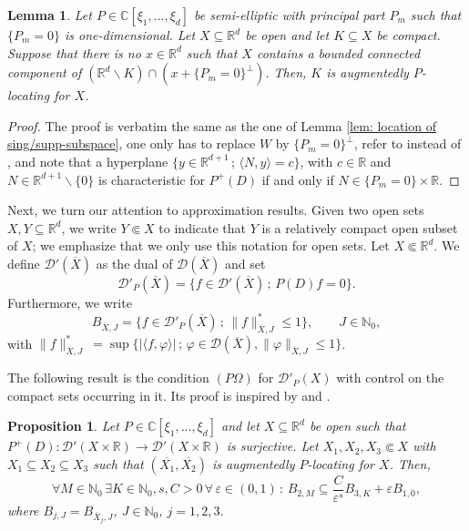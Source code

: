 \documentclass[12pt]{amsart}
\newcommand{\N}{\mathbb{N}}
\newcommand{\R}{\mathbb{R}}
\newcommand{\C}{\mathbb{C}}
\newtheorem{proposition}[theorem]{Proposition}
\newtheorem{lemma}[theorem]{Lemma}
\theoremstyle{definition}
\theoremstyle{remark}
\numberwithin{equation}{section}
\begin{document}
\begin{lemma}\label{prop: location of sing/supp-onedim}
	Let $P\in\C[\xi_1,\ldots,\xi_d]$ be semi-elliptic with principal part $P_m$ such that $\{P_m=0\}$ is one-dimensional. Let $X \subseteq \R^d$ be open and let $K \subseteq X$ be compact. Suppose that there is no $x\in\R^d$ such that $X$ contains a  bounded connected component of $\left(\R^d\backslash K\right)\cap\left(x+\{P_m=0\}^\perp\right)$.  Then, $K$ is augmentedly $P$-locating for $X$.
\end{lemma}	

\begin{proof}
The proof  is verbatim the same as the one of Lemma \ref{lem: location of sing/supp-subspace}, one only has to replace $W$ by $\{P_m=0\}^\perp$, refer to  \cite[Theorem 1]{FrKa} instead of \cite[Lemma 8]{Kalmes19}, and note that a hyperplane  $\{y\in\R^{d+1}\, ; \,\langle N, y \rangle =c \}$, with $c \in \R$ and $N \in \R^{d+1}\backslash \{0\}$ is characteristic for $P^+(D)$ if and only if $N\in\{P_m=0\}\times\R$.	
\end{proof} 

Next, we turn our attention to approximation results. Given two open sets $X,Y \subseteq \R^d$, we write $Y \Subset X$ to indicate that $Y$ is a relatively compact open subset of $X$; we emphasize that we only use this notation for open sets. Let $X \Subset \R^d$. We define $\mathscr{D}'(\overline{X})$ as the dual of $\mathscr{D}(\overline{X})$ and set
$$
\mathscr{D}'_P(\overline{X}) = \{f \in \mathscr{D}'(\overline{X}) \, ; \, P(D) f = 0\}.
$$
Furthermore, we write
$$
B_{\overline{X},J}=\{f \in\mathscr{D}'_P(\overline{X})\, ; \, \| f \|^*_{\overline{X},J}\leq 1\}, \qquad J \in \N_0,
$$
with $\| f \|^*_{\overline{X},J}\ = \sup \{ |\langle f, \varphi \rangle | \, ; \, \varphi \in \mathscr{D}(\overline{X}),  \| \varphi \|_{\overline{X},J} \leq 1    \}$. 

The following result is the condition $(P\Omega)$ for $\mathscr{D}'_P(X)$ \cite{B-D2006,DeKa22} with control on the compact sets occurring in it. Its proof is inspired by \cite[Theorem 4.1 and Propositon 8.1]{B-D2006} and  \cite[Section 3.4.5]{Wengenroth}.



\begin{proposition}\label{lem: explicit POmega}
	Let $P\in\C[\xi_1,\ldots,\xi_d]$ and let $X \subseteq \R^d$ be open such that $P^+(D): \mathscr{D}'(X \times \R) \to \mathscr{D}'(X \times \R)$ is surjective. Let $X_1, X_2, X_3 \Subset X$ with $X_1 \subseteq X_2 \subseteq X_3$  such that $(\overline{X_1}, \overline{X_2})$ is augmentedly $P$-locating for $X$. Then,
	$$
	\forall M\in\N_0\, \exists K \in \N_0, s, C > 0 \,  \forall\,\varepsilon\in (0,1)\,:\, B_{2,M}\subseteq\frac{C}{\varepsilon^s} B_{3,K}+\varepsilon B_{1,0},
	$$
	where $B_{j,J} = B_{\overline{X}_j,J}$, $J\in \N_0$, $j=1,2,3$.
\end{proposition}
\end{document}
